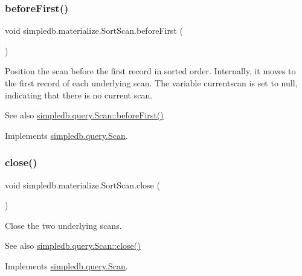 \subsubsection{\texorpdfstring{before\+First()}{beforeFirst()}}
{\footnotesize\ttfamily void simpledb.\+materialize.\+Sort\+Scan.\+before\+First (\begin{DoxyParamCaption}{ }\end{DoxyParamCaption})\hspace{0.3cm}{\ttfamily [inline]}}

Position the scan before the first record in sorted order. Internally, it moves to the first record of each underlying scan. The variable currentscan is set to null, indicating that there is no current scan. \begin{DoxySeeAlso}{See also}
\hyperlink{interfacesimpledb_1_1query_1_1Scan_a2eceb634b69da9bf1269a4355808cc6b}{simpledb.\+query.\+Scan\+::before\+First()} 
\end{DoxySeeAlso}


Implements \hyperlink{interfacesimpledb_1_1query_1_1Scan_a2eceb634b69da9bf1269a4355808cc6b}{simpledb.\+query.\+Scan}.

\mbox{\label{classsimpledb_1_1materialize_1_1SortScan_abbd920a65ae5509e705112fe6cfbb966}} 
\subsubsection{\texorpdfstring{close()}{close()}}
{\footnotesize\ttfamily void simpledb.\+materialize.\+Sort\+Scan.\+close (\begin{DoxyParamCaption}{ }\end{DoxyParamCaption})\hspace{0.3cm}{\ttfamily [inline]}}

Close the two underlying scans. \begin{DoxySeeAlso}{See also}
\hyperlink{interfacesimpledb_1_1query_1_1Scan_a260f40a8c82edaa00398bea9d698933c}{simpledb.\+query.\+Scan\+::close()} 
\end{DoxySeeAlso}


Implements \hyperlink{interfacesimpledb_1_1query_1_1Scan_a260f40a8c82edaa00398bea9d698933c}{simpledb.\+query.\+Scan}.


